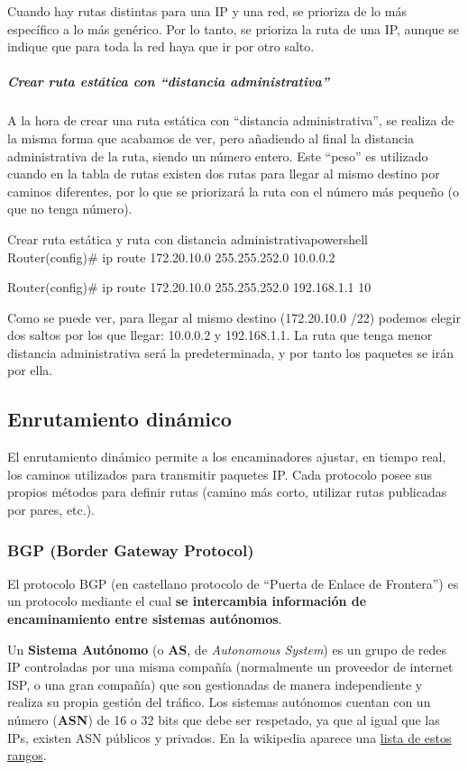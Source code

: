 Cuando hay rutas distintas para una IP y una red, se prioriza de lo más específico a lo más genérico. Por lo tanto, se prioriza la ruta de una IP, aunque se indique que para toda la red haya que ir por otro salto.


\subparagraph{Crear ruta estática con “distancia administrativa”}
A la hora de crear una ruta estática con “distancia administrativa”, se realiza de la misma forma que acabamos de ver, pero añadiendo al final la distancia administrativa de la ruta, siendo un número entero. Este “peso” es utilizado cuando en la tabla de rutas existen dos rutas para llegar al mismo destino por caminos diferentes, por lo que se priorizará la ruta con el número más pequeño (o que no tenga número).

\begin{mycode}{Crear ruta estática y ruta con distancia administrativa}{powershell}{}
Router(config)# ip route 172.20.10.0  255.255.252.0  10.0.0.2

Router(config)# ip route 172.20.10.0  255.255.252.0  192.168.1.1  10
\end{mycode}

Como se puede ver, para llegar al mismo destino (172.20.10.0 /22) podemos elegir dos saltos por los que llegar: 10.0.0.2 y 192.168.1.1. La ruta que tenga menor distancia administrativa será la predeterminada, y por tanto los paquetes se irán por ella.


\subsection{Enrutamiento dinámico}

El enrutamiento dinámico permite a los encaminadores ajustar, en tiempo real, los caminos utilizados para transmitir paquetes IP. Cada protocolo posee sus propios métodos para definir rutas (camino más corto, utilizar rutas publicadas por pares, etc.).


\subsubsection{BGP (Border Gateway Protocol)}
El protocolo BGP (en castellano protocolo de “Puerta de Enlace de Frontera”) es un protocolo mediante el cual \textbf{se intercambia información de encaminamiento entre sistemas autónomos}.


Un \textbf{Sistema Autónomo} (o \textbf{AS}, de \textit{Autonomous System}) es un grupo de redes IP controladas por una misma compañía (normalmente un proveedor de internet ISP, o una gran compañía) que son gestionadas de manera independiente y realiza su propia gestión del tráfico. Los sistemas autónomos cuentan con un número (\textbf{ASN}) de 16 o 32 bits que debe ser respetado, ya que al igual que las IPs, existen ASN públicos y privados. En la wikipedia aparece una \href{https://es.wikipedia.org/wiki/Sistema_aut%C3%B3nomo#Tabla_con_ASN_de_16-bit_y_32-bit}{lista de estos rangos}.

